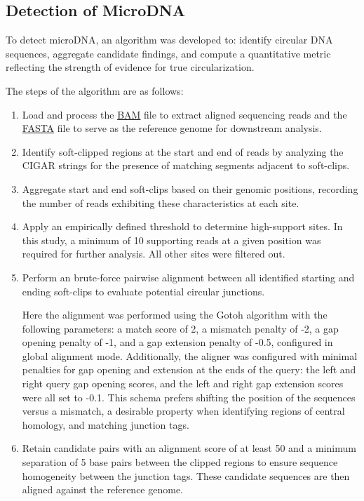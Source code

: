 \documentclass[11pt, letterpaper]{article}
\begin{document}
\subsection{Detection of MicroDNA}
To detect microDNA, an algorithm was developed to: identify circular DNA sequences, aggregate candidate findings, and compute a quantitative metric reflecting the strength of evidence for true circularization.

The steps of the algorithm are as follows:
\begin{enumerate}
    \item Load and process the \href{https://samtools.github.io/hts-specs/SAMv1.pdf}{BAM} file to extract aligned sequencing reads and the \href{https://www.ncbi.nlm.nih.gov/genbank/fastaformat/}{FASTA} file to serve as the reference genome for downstream analysis.
    \item Identify soft-clipped regions at the start and end of reads by analyzing the CIGAR strings for the presence of matching segments adjacent to soft-clips.
    \item Aggregate start and end soft-clips based on their genomic positions, recording the number of reads exhibiting these characteristics at each site.
    \item Apply an empirically defined threshold to determine high-support sites. In this study, a minimum of 10 supporting reads at a given position was required for further analysis. All other sites were filtered out.
    \item Perform an brute-force pairwise alignment between all identified starting and ending soft-clips to evaluate potential circular junctions. 

    Here the alignment was performed using the Gotoh algorithm with the following parameters: a match score of 2, a mismatch penalty of -2, a gap opening penalty of -1, and a gap extension penalty of -0.5, configured in global alignment mode. Additionally, the aligner was configured with minimal penalties for gap opening and extension at the ends of the query: the left and right query gap opening scores, and the left and right gap extension scores were all set to -0.1. This schema prefers shifting the position of the sequences versus a mismatch, a desirable property when identifying regions of central homology, and matching junction tags. 
    \item Retain candidate pairs with an alignment score of at least 50 and a minimum separation of 5 base pairs between the clipped regions to ensure sequence homogeneity between the junction tags. These candidate sequences are then aligned against the reference genome. 
    

\end{enumerate}
\end{document}
